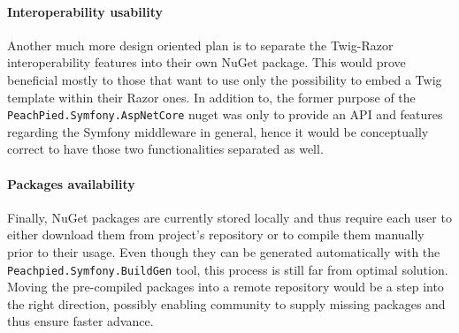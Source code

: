 \paragraph{Interoperability usability} Another much more design oriented plan is to separate the Twig-Razor interoperability features into their own NuGet package. This would prove beneficial mostly to those that want to use only the possibility to embed a Twig template within their Razor ones. In addition to, the former purpose of the \texttt{PeachPied.Symfony.AspNetCore} nuget was only to provide an API and features regarding the Symfony middleware in general, hence it would be conceptually correct to have those two functionalities separated as well.

\paragraph{Packages availability} Finally, NuGet packages are currently stored locally and thus require each user to either download them from project's repository or to compile them manually prior to their usage. Even though they can be generated automatically with the \texttt{Peachpied.Symfony.BuildGen} tool, this process is still far from optimal solution. Moving the pre-compiled packages into a remote repository would be a step into the right direction, possibly enabling community to supply missing packages and thus ensure faster advance.
